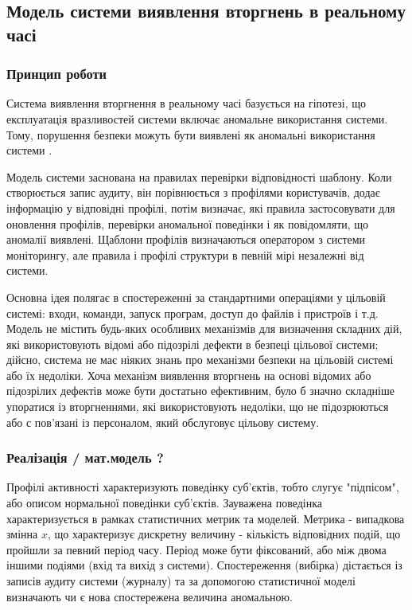\newpage
{}
\subsection{Модель системи виявлення вторгнень в реальному часі}
\subsubsection{Принцип роботи}
Система виявлення вторгнення в реальному часі базується на гіпотезі, що експлуатація вразливостей системи включає аномальне використання системи. Тому, порушення безпеки можуть бути виявлені як аномальні використання системи \cite{denning1987intrusion}.

Модель системи заснована на правилах перевірки відповідності шаблону. Коли створюється запис аудиту, він порівнюється з профілями користувачів, додає інформацію у відповідні профілі, потім визначає, які правила застосовувати для оновлення профілів, перевірки аномальної поведінки і як повідомляти, що аномалії виявлені. Щаблони профілів визначаються оператором з системи моніторингу, але правила і профілі структури в певній мірі незалежні від системи. %

Основна ідея полягає в спостереженні за стандартними операціями у цільовій системі: входи, команди, запуск програм, доступ до файлів і пристроїв і т.д. Модель не містить будь-яких особливих механізмів для визначення складних дій, які використовують відомі або підозрілі дефекти в безпеці цільової системи; дійсно, система не має ніяких знань про механізми безпеки на цільовій системі або їх недоліки. Хоча механізм виявлення вторгнень на основі відомих або підозрілих дефектів може бути достатьно ефективним, було б значно складніше упоратися із вторгненнями, які використовують недоліки, що не підозрюються або с пов'язані із персоналом, який обслуговує цільову систему.

\subsubsection{Реалізація / мат.модель ?\TBD}

Профілі активності характеризують поведінку суб'єктів, тобто слугує "підпісом", або описом нормальної поведінки суб'єктів. Зауважена поведінка характеризується в рамках статистичних метрик та моделей. Метрика - випадкова змінна $x$, що характеризує дискретну величину - кількість відповідних подій, що пройшли за певний період часу. Період може бути фіксований, або між двома іншими подіями (вхід та вихід з системи). Спостереження (вибірка) дістається із записів аудиту системи (журналу) та за допомогою статистичної моделі визначають чи є нова спостережена величина аномальною.


